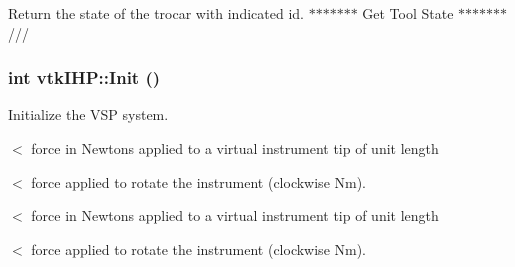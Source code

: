 Return the state of the trocar with indicated id. $\ast$$\ast$$\ast$$\ast$$\ast$$\ast$$\ast$ Get Tool State $\ast$$\ast$$\ast$$\ast$$\ast$$\ast$$\ast$/// \hypertarget{classvtkIHP_a055cc6c8150236aa3899647e32c3a0da}{
\subsubsection[{Init}]{\setlength{\rightskip}{0pt plus 5cm}int vtkIHP::Init ()}}
\label{classvtkIHP_a055cc6c8150236aa3899647e32c3a0da}


Initialize the VSP system. 

$<$ force in Newtons applied to a virtual instrument tip of unit length

$<$ force applied to rotate the instrument (clockwise Nm).

$<$ force in Newtons applied to a virtual instrument tip of unit length

$<$ force applied to rotate the instrument (clockwise Nm). 

